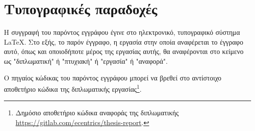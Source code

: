 \section{Τυπογραφικές παραδοχές} \label{section:1-6-typography}

Η συγγραφή του παρόντος εγγράφου έγινε στο ηλεκτρονικό, τυπογραφικό σύστημα \LaTeX. Στο εξής, το παρόν έγγραφο, η εργασία στην οποία αναφέρεται το έγγραφο αυτό, όπως και οποιοδήποτε μέρος της εργασίας αυτής, θα αναφέρονται στο κείμενο ως "διπλωματική" ή "πτυχιακή" ή "εργασία" ή "αναφορά".

Ο πηγαίος κώδικας του παρόντος εγγράφου μπορεί να βρεθεί στο αντίστοιχο αποθετήριο κώδικα της διπλωματικής εργασίας\footnote{Δημόσιο αποθετήριο κώδικα αναφοράς της διπλωματικής \url{https://gitlab.com/ecentrics/thesis-report}.}.
